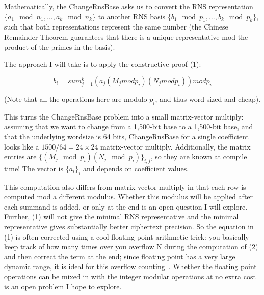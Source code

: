 Mathematically, the ChangeRnsBase asks us to convert the RNS representation
$\{a_1 \mod n_1, …, a_k \mod n_k\}$ to another RNS basis $\{b_1 \mod p_1, …, b_k
\mod p_k\}$, such that both representations represent the same number (the
Chinese Remainder Theorem guarantees that there is a unique representative mod
the product of the primes in the basis).

The approach I will take is to apply the constructive proof (1):

\begin{equation*}
b_i = sum_{j=1}^k (a_j (M_j mod p_i) (N_j mod p_i)) mod p_i
\end{equation*}

(Note that all the operations here are modulo $p_i$, and thus word-sized and
cheap).

This turns the ChangeRnsBase problem into a small matrix-vector multiply:
assuming that we want to change from a 1,500-bit base to a 1,500-bit base, and
that the underlying wordsize is 64 bits, ChangeRnsBase for a single coefficient
looks like a $1500/64=24\times 24$ matrix-vector multiply.
Additionally, the matrix entries are $\{(M_j \mod p_i) (N_j \mod p_i)\}_{i,
j}$, so they are known at compile time!
The vector is $\{a_i\}_i$ and depends on coefficient values.

This computation also differs from matrix-vector multiply in that each row is
computed mod a different modulus.
Whether this modulus will be applied after each summand is added, or only at
the end is an open question I will explore.
Further, (1) will not give the minimal RNS representative and the minimal
representative gives substantially better ciphertext precision\cite{bajard2017full}.
So the equation in (1) is often corrected using a cool floating-point
arithmetic trick: you basically keep track of how many times over you overflow
N during the computation of (2) and then correct the term at the end; since
floating point has a very large dynamic range, it is ideal for this overflow
counting~\cite{lattigo-github}.
Whether the floating point operations can be mixed in with the integer modular
operations at no extra cost is an open problem I hope to explore.

